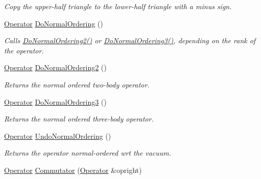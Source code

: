 \begin{DoxyCompactItemize}
\begin{DoxyCompactList}\small\item\em Copy the upper-\/half triangle to the lower-\/half triangle with a minus sign. \end{DoxyCompactList}\item 
\hypertarget{classOperator_a622880b91a902c832b867c6447a262e7}{\hyperlink{classOperator}{Operator} \hyperlink{classOperator_a622880b91a902c832b867c6447a262e7}{Do\-Normal\-Ordering} ()}\label{classOperator_a622880b91a902c832b867c6447a262e7}

\begin{DoxyCompactList}\small\item\em Calls \hyperlink{classOperator_a652d989590422a2b26e662625b07254e}{Do\-Normal\-Ordering2()} or \hyperlink{classOperator_a7fd029569796107c87ff17c5a7912480}{Do\-Normal\-Ordering3()}, depending on the rank of the operator. \end{DoxyCompactList}\item 
\hyperlink{classOperator}{Operator} \hyperlink{classOperator_a652d989590422a2b26e662625b07254e}{Do\-Normal\-Ordering2} ()
\begin{DoxyCompactList}\small\item\em Returns the normal ordered two-\/body operator. \end{DoxyCompactList}\item 
\hyperlink{classOperator}{Operator} \hyperlink{classOperator_a7fd029569796107c87ff17c5a7912480}{Do\-Normal\-Ordering3} ()
\begin{DoxyCompactList}\small\item\em Returns the normal ordered three-\/body operator. \end{DoxyCompactList}\item 
\hypertarget{classOperator_a1932dcab2be6bb889320254cc81dd5f4}{\hyperlink{classOperator}{Operator} \hyperlink{classOperator_a1932dcab2be6bb889320254cc81dd5f4}{Undo\-Normal\-Ordering} ()}\label{classOperator_a1932dcab2be6bb889320254cc81dd5f4}

\begin{DoxyCompactList}\small\item\em Returns the operator normal-\/ordered wrt the vacuum. \end{DoxyCompactList}\item 
\hypertarget{classOperator_a9d78ca5fd265cf4ccc6cda81d35cb086}{\hyperlink{classOperator}{Operator} \hyperlink{classOperator_a9d78ca5fd265cf4ccc6cda81d35cb086}{Commutator} (\hyperlink{classOperator}{Operator} \&opright)}\label{classOperator_a9d78ca5fd265cf4ccc6cda81d35cb086}


\end{DoxyCompactItemize}
